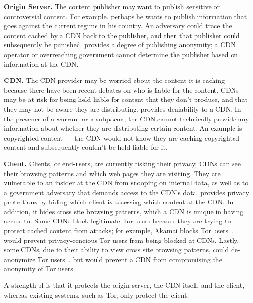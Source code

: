 {\bf Origin Server.} The content publisher may want to publish sensitive or controversial 
content.  For example, perhaps he wants to publish information that goes against the current 
regime in his country.  An adversary could trace the content cached by a CDN back to the 
publisher, and then that publisher could subsequently be punished.  \system{} provides a 
degree of publishing anonymity; a CDN operator or overreaching government cannot determine 
the publisher based on information at the CDN.

{\bf CDN.} The CDN provider may be worried about the content it is caching because there 
have been recent debates on who is liable for the content.  CDNs may be at risk for being held 
liable for content that they don't produce, and that they may not be aware they are distributing.  
\system{} provides deniability to a CDN.  In the presence of a warrant or a subpoena, the CDN 
cannot technically provide any information about whether they are distributing certain content.  An
example is copyrighted content --- the CDN would not know they are caching copyrighted content and 
subsequently couldn't be held liable for it.

{\bf Client.} Clients, or end-users, are currently risking their privacy; CDNs can see their 
browsing patterns and which web pages they are visiting.  They are vulnerable to an insider at 
the CDN from snooping on internal data, as well as to a government adversary that demands access 
to the CDN's data.  \system{} provides privacy protections by hiding which client is accessing 
which content at the CDN.  In addition, it hides cross site browsing patterns, which a CDN 
is unique in having access to.  Some CDNs block legitimate Tor users because they are 
trying to protect cached content from attacks; for example, Akamai blocks Tor users~\cite{khattak2016you}.    \system{} would prevent 
privacy-concious Tor users from being blocked at CDNs.  Lastly, some CDNs, due to their ability 
to view cross site browsing patterns, could de-anonymize Tor users~\cite{cloudflare_tor}, but \system{} would 
prevent a CDN from compromising the anonymity of Tor users.

A strength of \system{} is that it protects the origin server, the CDN itself, and the client, whereas 
existing systems, such as Tor, only protect the client.

